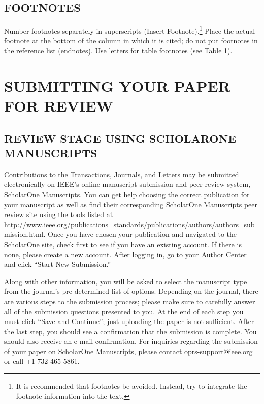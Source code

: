\documentclass{ieeetj}
\begin{document}
\subsection{FOOTNOTES}
Number footnotes separately in superscripts (Insert\textbar
Footnote).\footnote{It is recommended that footnotes be avoided. Instead,
try to integrate the footnote information into the text.} Place the actual
footnote at the bottom of the column in which it is cited; do not put
footnotes in the reference list (endnotes). Use letters for table footnotes
(see Table 1).

\section{SUBMITTING YOUR PAPER FOR REVIEW}

\subsection{REVIEW STAGE USING SCHOLARONE MANUSCRIPTS}

Contributions to the Transactions, Journals, and Letters may be submitted electronically on IEEE's online manuscript submission and peer-review system, ScholarOne Manuscripts. You can get help choosing the correct publication for your manuscript as well as find their corresponding ScholarOne Manuscripts peer review site using the tools listed at http://\discretionary{}{}{}www.ieee.org/\discretionary{}{}{}publications\_standards/\discretionary{}{}{}publications/\discretionary{}{}{}authors/\discretionary{}{}{}authors\_submission.html. Once you have chosen your publication and navigated to the ScholarOne site, check first to see if you have an existing account. If there is none, please create a new account. After logging in, go to your Author Center and click ``Start New Submission.''

Along with other information, you will be asked to select the manuscript type from the journal's pre-determined list of options. Depending on the journal, there are various steps to the submission process; please make sure to carefully answer all of the submission questions presented to you. At the end of each step you must click ``Save and Continue''; just uploading the paper is not sufficient. After the last step, you should see a confirmation that the submission is complete. You should also receive an e-mail confirmation. For inquiries regarding the submission of your paper on ScholarOne Manuscripts, please contact oprs-support@ieee.org or call +1 732 465 5861.
\end{document}
